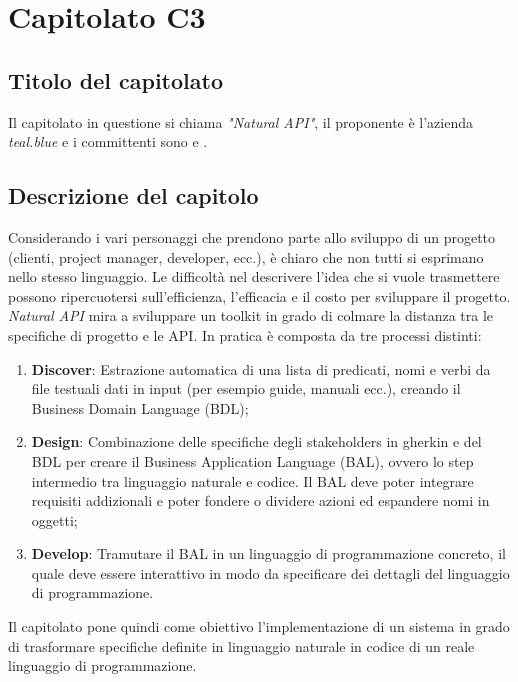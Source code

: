 \section{Capitolato C3}
\subsection{Titolo del capitolato}
Il capitolato in questione si chiama \textit{"Natural API"}, il proponente è l'azienda \textit{teal.blue} e i committenti sono \VT{} e \CR{}.

\subsection{Descrizione del capitolo}
Considerando i vari personaggi che prendono parte allo sviluppo di un progetto (clienti, project manager, developer, ecc.), è chiaro che non tutti si esprimano nello stesso linguaggio. Le difficoltà nel descrivere l'idea che si vuole trasmettere possono ripercuotersi sull'efficienza, l'efficacia e il costo per sviluppare il progetto. \textit{Natural API} mira a sviluppare un toolkit in grado di colmare la distanza tra le specifiche di progetto e le API. In pratica è composta da tre processi distinti:
\begin{enumerate}
\item \textbf{Discover}: Estrazione automatica di una lista di predicati, nomi e verbi da file testuali dati in input (per esempio guide, manuali ecc.), creando il Business Domain Language (BDL);
\item \textbf{Design}: Combinazione delle specifiche degli stakeholders in gherkin e del BDL per creare il Business Application Language (BAL), ovvero lo step intermedio tra linguaggio naturale e codice. Il BAL deve poter integrare requisiti addizionali e poter fondere o dividere azioni ed espandere nomi in oggetti;
\item \textbf{Develop}: Tramutare il BAL in un linguaggio di programmazione concreto, il quale deve essere interattivo in modo da specificare dei dettagli del linguaggio di programmazione.
\end{enumerate}

Il capitolato pone quindi come obiettivo l'implementazione di un sistema in grado di trasformare specifiche definite in linguaggio naturale in codice di un reale linguaggio di programmazione.

